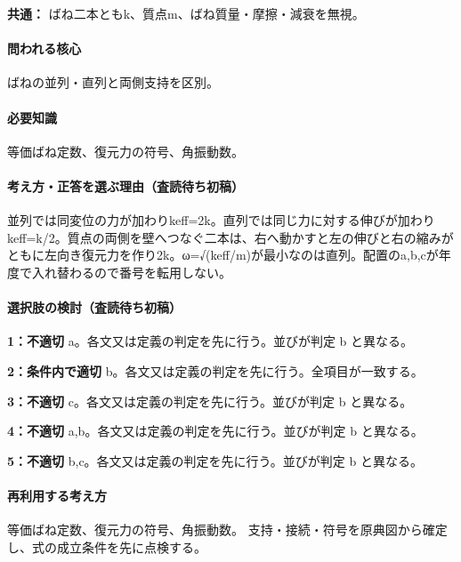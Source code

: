 \noindent\textbf{共通：} ばね二本ともk、質点m、ばね質量・摩擦・減衰を無視。\par

\paragraph{問われる核心} ばねの並列・直列と両側支持を区別。

\paragraph{必要知識} 等価ばね定数、復元力の符号、角振動数。

\paragraph{考え方・正答を選ぶ理由（査読待ち初稿）} 並列では同変位の力が加わりkeff=\allowbreak{}2k。直列では同じ力に対する伸びが加わりkeff=\allowbreak{}k/2。質点の両側を壁へつなぐ二本は、右へ動かすと左の伸びと右の縮みがともに左向き復元力を作り2k。ω=√(keff/m)が最小なのは直列。配置のa,b,cが年度で入れ替わるので番号を転用しない。

\paragraph{選択肢の検討（査読待ち初稿）}\mbox{}\par

\noindent\textbf{1：不適切} a。各文又は定義の判定を先に行う。並びが判定 b と異なる。\par

\noindent\textbf{2：条件内で適切} b。各文又は定義の判定を先に行う。全項目が一致する。\par

\noindent\textbf{3：不適切} c。各文又は定義の判定を先に行う。並びが判定 b と異なる。\par

\noindent\textbf{4：不適切} a,b。各文又は定義の判定を先に行う。並びが判定 b と異なる。\par

\noindent\textbf{5：不適切} b,c。各文又は定義の判定を先に行う。並びが判定 b と異なる。\par

\paragraph{再利用する考え方} 等価ばね定数、復元力の符号、角振動数。 支持・接続・符号を原典図から確定し、式の成立条件を先に点検する。

